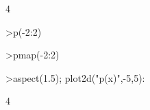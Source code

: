 \documentclass{article}
\begin{document}
\begin{eulernotebook}
\begin{eulercomment}
\begin{eulercomment}
\begin{euleroutput}
  4
\end{euleroutput}
\begin{eulerprompt}
>p(-2:2)
\end{eulerprompt}
\begin{euleroutput}
  [4,  1,  0,  1,  8]
\end{euleroutput}
\begin{eulerprompt}
>pmap(-2:2)
\end{eulerprompt}
\begin{euleroutput}
  [4,  1,  0,  1,  8]
\end{euleroutput}
\begin{eulerprompt}
>aspect(1.5); plot2d("p(x)",-5,5):
\end{eulerprompt}
\begin{eulercomment}
4


\end{eulercomment}
\end{eulercomment}
\end{eulercomment}
\end{eulernotebook}
\end{document}
